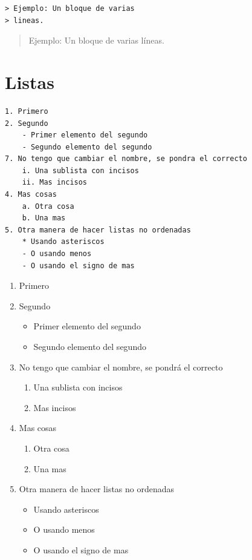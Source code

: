 \documentclass[]{article}
\providecommand{\tightlist}{%
  \setlength{\itemsep}{0pt}\setlength{\parskip}{0pt}}
\begin{document}
\begin{verbatim}
> Ejemplo: Un bloque de varias
> lineas.
\end{verbatim}

\begin{quote}
Ejemplo: Un bloque de varias líneas.
\end{quote}

\section{Listas}\label{listas}

\begin{verbatim}
1. Primero
2. Segundo
    - Primer elemento del segundo
    - Segundo elemento del segundo
7. No tengo que cambiar el nombre, se pondra el correcto
    i. Una sublista con incisos
    ii. Mas incisos
4. Mas cosas
    a. Otra cosa
    b. Una mas
5. Otra manera de hacer listas no ordenadas
    * Usando asteriscos
    - O usando menos
    - O usando el signo de mas
\end{verbatim}

\begin{enumerate}
\def\labelenumi{\arabic{enumi}.}
\tightlist
\item
  Primero
\item
  Segundo

  \begin{itemize}
  \tightlist
  \item
    Primer elemento del segundo
  \item
    Segundo elemento del segundo
  \end{itemize}
\item
  No tengo que cambiar el nombre, se pondrá el correcto

  \begin{enumerate}
  \def\labelenumii{\roman{enumii}.}
  \tightlist
  \item
    Una sublista con incisos
  \item
    Mas incisos
  \end{enumerate}
\item
  Mas cosas

  \begin{enumerate}
  \def\labelenumii{\alph{enumii}.}
  \tightlist
  \item
    Otra cosa
  \item
    Una mas
  \end{enumerate}
\item
  Otra manera de hacer listas no ordenadas

  \begin{itemize}
  \tightlist
  \item
    Usando asteriscos
  \item
    O usando menos
  \item
    O usando el signo de mas
  \end{itemize}
\end{enumerate}
\end{document}
